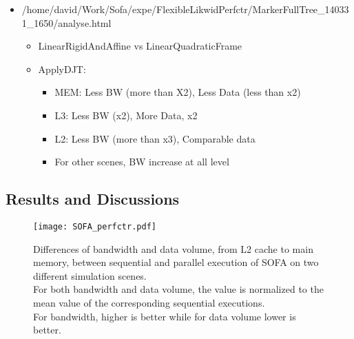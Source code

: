 \begin{itemize}
    \item /home/david/Work/Sofa/expe/FlexibleLikwidPerfctr/MarkerFullTree\_140331\_1650/analyse.html
        \begin{itemize}
            \item LinearRigidAndAffine vs LinearQuadraticFrame
                    \item ApplyDJT:
                        \begin{itemize}
                            \item MEM: Less BW (more than X2), Less Data (less than x2)
                            \item L3: Less BW (x2), More Data, x2
                            \item L2: Less BW (more than x3), Comparable data
                            \item For other scenes, BW increase at all level
                        \end{itemize}
        \end{itemize}
\end{itemize}




\subsection{Results and Discussions}

\begin{figure}[htb]
    \centering
    \texttt{[image: SOFA\_perfctr.pdf]}
    \caption[SOFA likwid results]{Differences of bandwidth and data volume, from L2 cache to main
        memory, between sequential and parallel execution of \gls{SOFA} on two
        different simulation scenes.
        \\
        For both bandwidth and data volume, the value is normalized to the
        mean value of the corresponding sequential executions.
        \\
        For bandwidth, higher is better while for data volume lower is better.
    }
    \label{fig:SOFA-perfctr}
\end{figure}

